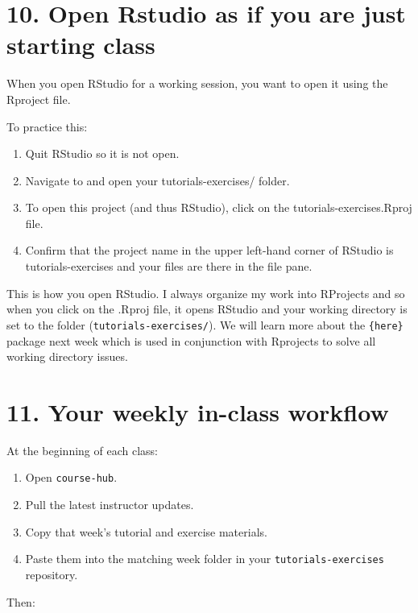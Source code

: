 \documentclass[
  letterpaper,
  DIV=11,
  numbers=noendperiod]{scrartcl}
\providecommand{\tightlist}{%
  \setlength{\itemsep}{0pt}\setlength{\parskip}{0pt}}
\begin{document}
\section{10. Open Rstudio as if you are just starting
class}\label{open-rstudio-as-if-you-are-just-starting-class}

When you open RStudio for a working session, you want to open it using
the Rproject file.

To practice this:

\begin{enumerate}
\def\labelenumi{\arabic{enumi}.}
\tightlist
\item
  Quit RStudio so it is not open.
\item
  Navigate to and open your tutorials-exercises/ folder.
\item
  To open this project (and thus RStudio), click on the
  tutorials-exercises.Rproj file.
\item
  Confirm that the project name in the upper left-hand corner of RStudio
  is tutorials-exercises and your files are there in the file pane.
\end{enumerate}

This is how you open RStudio. I always organize my work into RProjects
and so when you click on the .Rproj file, it opens RStudio and your
working directory is set to the folder (\texttt{tutorials-exercises/}).
We will learn more about the \texttt{\{here\}} package next week which
is used in conjunction with Rprojects to solve all working directory
issues.

\section{11. Your weekly in-class
workflow}\label{your-weekly-in-class-workflow}

At the beginning of each class:

\begin{enumerate}
\def\labelenumi{\arabic{enumi}.}
\tightlist
\item
  Open \texttt{course-hub}.
\item
  Pull the latest instructor updates.
\item
  Copy that week's tutorial and exercise materials.
\item
  Paste them into the matching week folder in your
  \texttt{tutorials-exercises} repository.
\end{enumerate}

Then:
\end{document}
